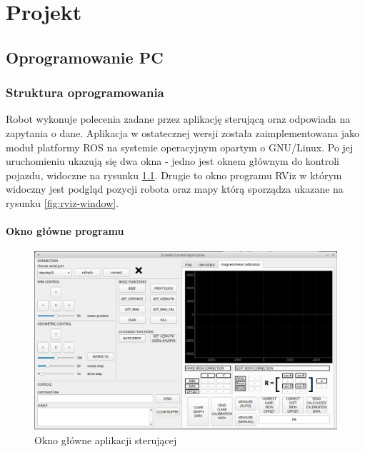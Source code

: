 \chapter{Projekt}
\section{Oprogramowanie PC}
\subsection{Struktura oprogramowania}

Robot wykonuje polecenia zadane przez aplikację sterującą oraz odpowiada na zapytania o dane. Aplikacja w ostatecznej wersji została zaimplementowana jako moduł platformy ROS\cite{ros} na systemie operacyjnym opartym o GNU/Linux. Po jej uruchomieniu ukazują się dwa okna - jedno jest oknem głównym do kontroli pojazdu, widoczne na rysunku \ref{fig:app-main-window}. Drugie to okno programu RViz w którym widoczny jest podgląd pozycji robota oraz mapy którą sporządza ukazane na rysunku \ref{fig:rviz-window}.

\subsubsection{Okno główne programu}
\begin{figure}[ht]
	\centering
		\includegraphics[width=1\linewidth]{rys/main-app-view-3.PNG}
	\caption{Okno główne aplikacji sterującej}
	\label{fig:app-main-window}
\end{figure}

